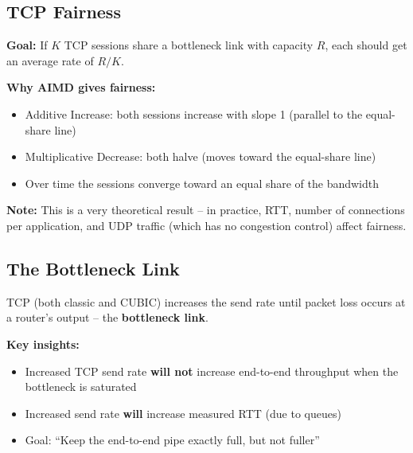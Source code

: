 \begin{imagebox}
\end{imagebox}

\subsection{TCP Fairness}

\begin{keybox}
\textbf{Goal:} If $K$ TCP sessions share a bottleneck link with capacity $R$, each should get an average rate of $R/K$.

\textbf{Why AIMD gives fairness:}
\begin{itemize}[noitemsep]
    \item Additive Increase: both sessions increase with slope 1 (parallel to the equal-share line)
    \item Multiplicative Decrease: both halve (moves toward the equal-share line)
    \item Over time the sessions converge toward an equal share of the bandwidth
\end{itemize}

\textbf{Note:} This is a very theoretical result -- in practice, RTT, number of connections per application, and UDP traffic (which has no congestion control) affect fairness.
\end{keybox}

\begin{imagebox}
\end{imagebox}

\subsection{The Bottleneck Link}

\begin{warnbox}
TCP (both classic and CUBIC) increases the send rate until packet loss occurs at a router's output -- the \textbf{bottleneck link}.

\textbf{Key insights:}
\begin{itemize}[noitemsep]
    \item Increased TCP send rate \textbf{will not} increase end-to-end throughput when the bottleneck is saturated
    \item Increased send rate \textbf{will} increase measured RTT (due to queues)
    \item Goal: ``Keep the end-to-end pipe exactly full, but not fuller''
\end{itemize}
\end{warnbox}

